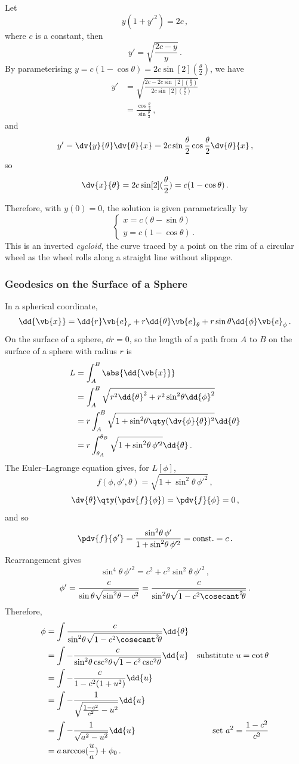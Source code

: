 \documentclass{article}
\theoremstyle{plain}\theoremheaderfont{\normalfont\itshape}\theorembodyfont{\rmfamily}\theoremseparator{.}\newtheorem*{rem}{Remark}\newtheorem*{ex}{Example}\newtheorem*{proof}{Proof}\newtheorem*{altp}{Alternative proof}
\theoremstyle{plain}\theoremheaderfont{\normalfont\bfseries}\theorembodyfont{\rmfamily}\theoremseparator{.}\newtheorem{thm}{Theorem}[section]\newtheorem{lem}[thm]{Lemma}\newtheorem{prop}[thm]{Proposition}\newtheorem*{cor}{Corollary}\newtheorem{defn}[thm]{Definition}\newtheorem{clm}[thm]{Claim}\newtheorem{clminproof}{Claim}
\theoremstyle{break}\theoremheaderfont{\normalfont\itshape}\theorembodyfont{\rmfamily}\theoremseparator{.\medskip}\newtheorem*{proofskip}{Proof}\newtheorem*{exs}{Examples}\newtheorem*{rems}{Remarks}
\theoremstyle{break}\theoremheaderfont{\normalfont\bfseries}\theorembodyfont{\rmfamily}\theoremseparator{.\medskip}\newtheorem{lemskip}[thm]{Lemma}\newtheorem{defnskip}[thm]{Definition}\newtheorem{propskip}[thm]{Proposition}\newtheorem{thmskip}[thm]{Theorem}
\numberwithin{equation}{section}
\begin{document}
	Let
	\[y(1+y'^2)=2c\,,\]
	where \(c\) is a constant, then
	\[y'=\sqrt{\frac{2c-y}{y}}\,.\]
	By parameterising \(y=c(1-\cos\theta)=2c\sin[2](\frac{\theta}{2})\), we have
	\begin{align*}
		y'&=\sqrt{\frac{2c-2c\sin[2](\frac{\theta}{2})}{2c\sin[2](\frac{\theta}{2})}}\\
		&=\frac{\cos\frac{\theta}{2}}{\sin\frac{\theta}{2}}\,,
	\end{align*}
	and
	\[y'=\dv{y}{\theta}\dv{\theta}{x}=2c\sin\frac{\theta}{2}\cos\frac{\theta}{2}\dv{\theta}{x}\,,\]
	so
	\[\dv{x}{\theta}=2c\sin[2](\frac{\theta}{2})=c(1-\cos\theta)\,.\]

	Therefore, with \(y(0)=0\), the solution is given parametrically by
	\[\begin{cases}
		x=c(\theta-\sin\theta)\\
		y=c(1-\cos\theta)\,.
	\end{cases}\]
	This is an inverted \textit{cycloid}, the curve traced by a point on the rim of a circular wheel as the
	wheel rolls along a straight line without slippage.
	\subsubsection{Geodesics on the Surface of a Sphere}
	In a spherical coordinate,
	\[\dd{\vb{x}}=\dd{r}\vb{e}_r+r\dd{\theta}\vb{e}_\theta+r\sin\theta\dd{\phi}\vb{e}_\phi\,.\]
	On the surface of a sphere, \(\dd{r}=0\), so the length of a path from \(A\) to \(B\) on the surface of a sphere with radius \(r\) is
	\begin{align*}
		L&=\int_{A}^{B}\abs{\dd{\vb{x}}}\\
		&=\int_{A}^{B}\sqrt{r^2\dd{\theta}^2+r^2\sin^2\!\theta\dd{\phi}^2}\\
		&=r\int_{A}^{B}\sqrt{1+\sin^2\!\theta\qty(\dv{\phi}{\theta})^2}\dd{\theta}\\
		&=r\int_{\theta_A}^{\theta_B}\sqrt{1+\sin^2\!\theta\,\phi'^2}\dd{\theta}\,.
	\end{align*}
	The Euler--Lagrange equation gives, for \(L[\phi]\),
	\[f(\phi,\phi',\theta)=\sqrt{1+\sin^2\!\theta\,\phi'^2}\,,\]
	\[\dv{\theta}\qty(\pdv{f}{\phi})=\pdv{f}{\phi}=0\,,\]
	and so
	\[\pdv{f}{\phi'}=\frac{\sin^2\!\theta\,\phi'}{1+\sin^2\!\theta\,\phi'^2}=\text{const.}=c\,.\]
	Rearrangement gives
	\[\sin^4\!\theta\,\phi'^2=c^2+c^2\sin^2\!\theta\,\phi'^2\,,\]
	\[\phi'=\frac{c}{\sin\theta\sqrt{\sin^2\!\theta-c^2}}=\frac{c}{\sin^2\!\theta\sqrt{1-c^2\cosecant^2\!\theta}}\,.\]
	Therefore,
	\begin{align*}
		\phi&=\int\frac{c}{\sin^2\!\theta\sqrt{1-c^2\cosecant^2\!\theta}}\dd{\theta}\\
		&=\int-\frac{c}{\sin^2\!\theta\csc^2\!\theta\sqrt{1-c^2\csc^2\!\theta}}\dd{u} &\text{substitute } u=\cot\theta\\
		&=\int-\frac{c}{1-c^2(1+u^2)}\dd{u}\\
		&=\int-\frac{1}{\sqrt{\frac{1-c^2}{c^2}-u^2}}\dd{u}\\
		&=\int-\frac{1}{\sqrt{a^2-u^2}}\dd{u} & \text{set }a^2=\frac{1-c^2}{c^2}\\
		&=a\arccos(\frac{u}{a})+\phi_0\,.
	\end{align*}
\end{document}
